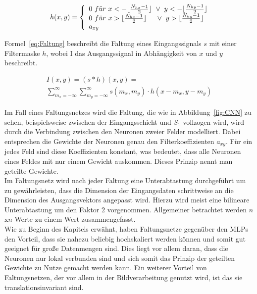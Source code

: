 \documentclass[times, 12pt,twocolumn]{article}
\begin{document}
\footnotesize
\begin{equation} 
	h(x,y) = \left\lbrace
  \begin{array}{l@{}l}
   0~f\ddot{u}r~x<-\lfloor\frac{N_{hx}-1}{2}\rfloor~\vee~y<-\lfloor\frac{N_{hy}-1}{2}\rfloor\\
    0~f\ddot{u}r~x>\lfloor\frac{N_{hx}-1}{2}\rfloor~~~~\vee~y>\lfloor\frac{N_{hy}-1}{2}\rfloor \\
    a_{xy}
  \end{array}
  \right.	
	\label{eq:Filtermaske}
\end{equation}
\small  

Formel~\ref{eq:Faltung} beschreibt die Faltung eines Eingangssignals $s$ mit einer Filtermaske $h$, wobei I das Ausgangssignal in Abhängigkeit von $x$ und $y$ beschreibt.

\footnotesize
\begin{equation}
\begin{aligned}
I(x,y) = (s*h)(x,y) = \\
\sum_{m_x=-\infty}^\infty \sum_{m_y=-\infty}^\infty s(m_x,m_y) \cdot h(x-m_x,y-m_y) 
\end{aligned}
	\label{eq:Faltung}
\end{equation}
\small

Im Fall eines Faltungsnetzes wird die Faltung, die wie in Abbildung~\ref{fig:CNN} zu sehen, beispielsweise zwischen der Eingangsschicht und $S_1$ vollzogen wird, wird durch die Verbindung zwischen den Neuronen zweier Felder modelliert. Dabei entsprechen die Gewichte der Neuronen genau den Filterkoeffizienten $a_{xy}$. Für ein jedes Feld sind diese Koeffizienten konstant, was bedeutet, dass alle Neuronen eines Feldes mit nur einem Gewicht auskommen. Dieses Prinzip nennt man geteilte Gewichte. \\

Im Faltungsnetz wird nach jeder Faltung eine Unterabtastung durchgeführt um zu gewährleisten, dass die Dimension der Eingangsdaten schrittweise an die Dimension des Ausgangsvektors angepasst wird. Hierzu wird meist eine bilineare Unterabtastung um den Faktor 2 vorgenommen. Allgemeiner betrachtet werden $n$x$n$ Werte zu einem Wert zusammengefasst.\\

Wie zu Beginn des Kapitels erwähnt, haben Faltungsnetze gegenüber den MLPs den Vorteil, dass sie nahezu beliebig hochskaliert werden können und somit gut geeignet für große Datenmengen sind. Dies liegt vor allem daran, dass die Neuronen nur lokal verbunden sind und sich somit das Prinzip der geteilten Gewichte zu Nutze gemacht werden kann. Ein weiterer Vorteil von Faltungsnetzen, der vor allem in der Bildverarbeitung genutzt wird, ist das sie translationsinvariant sind.
\end{document}
